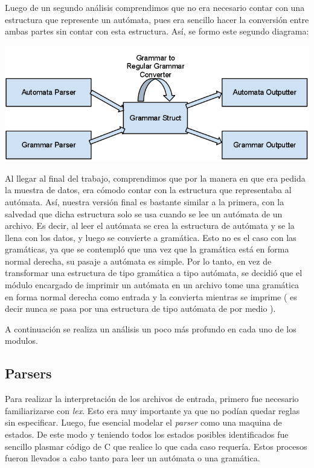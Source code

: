 \documentclass[a4paper,10pt]{article}
\begin{document}
      Luego de un segundo análisis comprendimos que no era necesario contar con una estructura que represente
       un autómata, pues era sencillo hacer la conversión entre ambas partes sin contar con esta estructura.
      Así, se formo este segundo diagrama:

      \begin{center}
 \includegraphics[scale=0.5]{./images/ATL-PrimerDiagrama.png}
\end{center}


      Al llegar al final del trabajo, comprendimos que por la manera en que era pedida la muestra de datos,
       era cómodo contar con la estructura que representaba al autómata. Así, nuestra versión final es bastante similar
       a la primera, con la salvedad que dicha estructura solo se usa cuando se lee un autómata de un archivo. Es decir, al leer el autómata 
se crea la estructura de autómata y se la llena con los datos, y luego se convierte a gramática. Esto no es el caso con las gramáticas, ya que 
se contempló que una vez que la gramática está en forma normal derecha, su pasaje a autómata es simple. Por lo tanto, en vez de transformar una estructura 
de tipo gramática a tipo autómata, se decidió que el módulo encargado de imprimir un autómata en un archivo tome una gramática en forma normal derecha 
como entrada y la convierta mientras se imprime ( es decir nunca se pasa por una estructura de tipo autómata de por medio ).

      A continuación se realiza un análisis un poco más profundo en cada uno de los modulos.

      \newpage

      \subsection{Parsers}
            Para realizar la interpretación de los archivos de entrada, primero fue necesario familiarizarse con
            \textit{lex}. Esto era muy importante ya que no podían quedar reglas sin especificar. 
            Luego, fue esencial modelar el \textit{parser} como una maquina de estados. De este modo y teniendo
            todos los estados posibles identificados fue sencillo plasmar código de C que realice lo que cada caso
            requería. 
            Estos procesos fueron llevados a cabo tanto para leer un autómata o una gramática.
\end{document}
